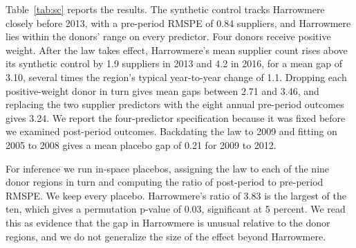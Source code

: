 \documentclass[11pt]{article}
\begin{document}
Table~\ref{tab:sc} reports the results. The synthetic control tracks Harrowmere closely before 2013, with a pre-period RMSPE of 0.84 suppliers, and Harrowmere lies within the donors' range on every predictor. Four donors receive positive weight. After the law takes effect, Harrowmere's mean supplier count rises above its synthetic control by 1.9 suppliers in 2013 and 4.2 in 2016, for a mean gap of 3.10, several times the region's typical year-to-year change of 1.1. Dropping each positive-weight donor in turn gives mean gaps between 2.71 and 3.46, and replacing the two supplier predictors with the eight annual pre-period outcomes gives 3.24. We report the four-predictor specification because it was fixed before we examined post-period outcomes. Backdating the law to 2009 and fitting on 2005 to 2008 gives a mean placebo gap of 0.21 for 2009 to 2012.

For inference we run in-space placebos, assigning the law to each of the nine donor regions in turn and computing the ratio of post-period to pre-period RMSPE. We keep every placebo. Harrowmere's ratio of 3.83 is the largest of the ten, which gives a permutation p-value of 0.03, significant at 5 percent. We read this as evidence that the gap in Harrowmere is unusual relative to the donor regions, and we do not generalize the size of the effect beyond Harrowmere.
\end{document}

